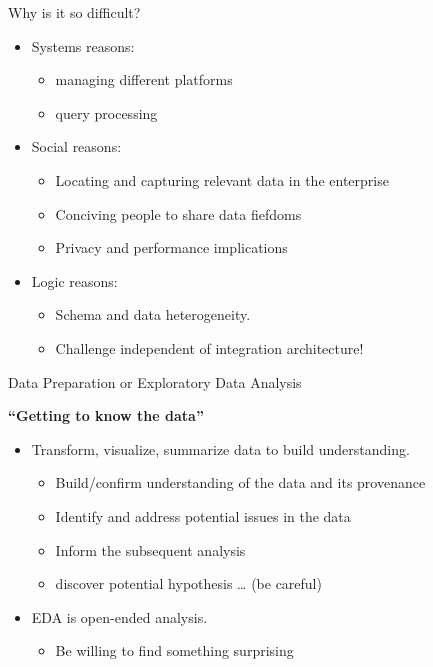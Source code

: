 \documentclass[aspectratio=169]{../latex_main/tntbeamer}  %
\begin{document}
\begin{frame}[c]{Why is it so difficult?}
    \begin{itemize}
        \item Systems reasons: 
        \begin{itemize}
            \item managing different platforms
            \item query processing
        \end{itemize}
        \item Social reasons:
        \begin{itemize}
            \item Locating and capturing relevant data in the enterprise
            \item Conciving people to share data fiefdoms
            \item Privacy and performance implications
        \end{itemize}
        \item Logic reasons: 
        \begin{itemize}
            \item Schema and data heterogeneity.
            \item Challenge independent of integration architecture!
        \end{itemize}
    \end{itemize}
\end{frame}

\begin{frame}[c]{Data Preparation or Exploratory Data Analysis}

\textbf{``Getting to know the data''}

    \begin{itemize}
        \item Transform, visualize, summarize data to build understanding.
        \begin{itemize}
            \item Build/confirm understanding of the data and its provenance
            \item Identify and address potential issues in the data
            \item Inform the subsequent analysis 
            \item discover potential hypothesis … (be careful)
        \end{itemize}
        \item EDA is open-ended analysis.
        \begin{itemize}
            \item Be willing to find something surprising
        \end{itemize}
    \end{itemize}
\end{frame}
\end{document}
